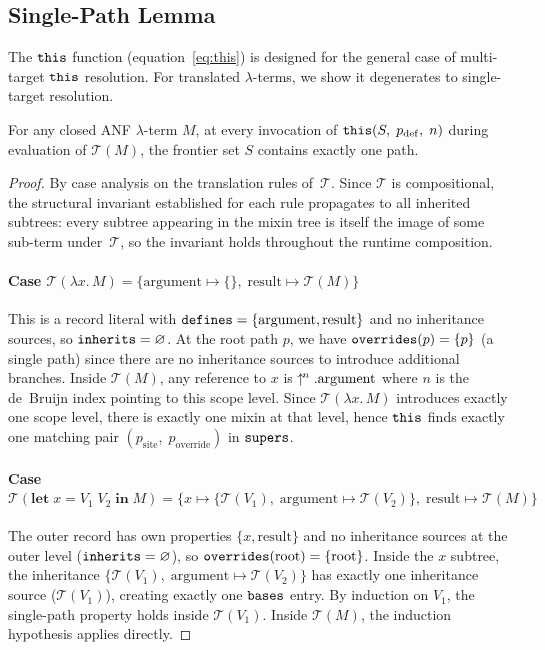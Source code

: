 \subsection{Single-Path Lemma}

The $\mathtt{this}$ function (equation~\ref{eq:this}) is designed for the
general case of multi-target $\mathtt{this}$ resolution.
For translated $\lambda$-terms, we show it degenerates to
single-target resolution.

\begin{lemma}\label{lem:single-path}
  For any closed ANF $\lambda$-term $M$, at every invocation of
  $\mathtt{this}(S,\; p_{\mathrm{def}},\; n)$ during evaluation of
  $\mathcal{T}(M)$, the frontier set $S$ contains exactly one
  path.
\end{lemma}

\begin{proof}
  By case analysis on the translation rules of~$\mathcal{T}$.
  Since $\mathcal{T}$ is compositional, the structural invariant
  established for each rule propagates to all inherited subtrees:
  every subtree appearing in the mixin tree is itself the image of
  some sub-term under~$\mathcal{T}$, so the invariant holds
  throughout the runtime composition.

  \paragraph{Case $\mathcal{T}(\lambda x.\, M)
    = \{\mathrm{argument} \mapsto \{\},\;
  \mathrm{result} \mapsto \mathcal{T}(M)\}$}
  This is a record literal with
  $\mathtt{defines} = \{\mathrm{argument}, \mathrm{result}\}$ and
  no inheritance sources, so $\mathtt{inherits} = \varnothing$.
  At the root path $p$, we have $\mathtt{overrides}(p) = \{p\}$ (a single
  path) since there are no inheritance sources to introduce
  additional branches.
  Inside $\mathcal{T}(M)$, any reference to $x$ is
  $\uparrow^{\!n}.\mathrm{argument}$ where $n$ is the de~Bruijn index
  pointing to this scope level.
  Since $\mathcal{T}(\lambda x.\, M)$ introduces exactly one
  scope level, there is exactly one
  mixin at that level, hence $\mathtt{this}$ finds exactly one matching
  pair $(p_{\mathrm{site}},\; p_{\mathrm{override}})$ in $\mathtt{supers}$.

  \paragraph{Case
    $\mathcal{T}(\mathbf{let}\; x = V_1\; V_2
    \;\mathbf{in}\; M)
    = \{x \mapsto \{\mathcal{T}(V_1),\;
      \mathrm{argument} \mapsto \mathcal{T}(V_2)\},\;
  \mathrm{result} \mapsto \mathcal{T}(M)\}$}
  The outer record has own properties $\{x, \mathrm{result}\}$
  and no inheritance sources at the outer level
  ($\mathtt{inherits} = \varnothing$), so $\mathtt{overrides}(\text{root})
  = \{\text{root}\}$.
  Inside the $x$ subtree, the inheritance
  $\{\mathcal{T}(V_1),\; \mathrm{argument} \mapsto
  \mathcal{T}(V_2)\}$ has exactly one inheritance source
  ($\mathcal{T}(V_1)$), creating exactly one $\mathtt{bases}$ entry.
  By induction on $V_1$, the single-path property holds inside
  $\mathcal{T}(V_1)$.
  Inside $\mathcal{T}(M)$, the induction hypothesis applies
  directly.


\end{proof}
